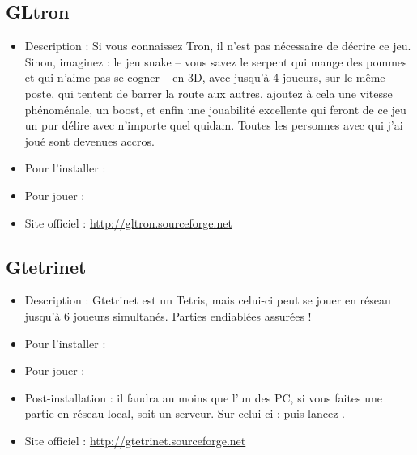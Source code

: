 \subsection{GLtron}
\begin{itemize}
\begingroup
{}
\item Description : Si vous connaissez Tron, il n'est pas nécessaire de décrire ce jeu. Sinon, imaginez : le jeu snake -- vous savez le serpent qui mange des pommes et qui n'aime pas se cogner -- en 3D, avec jusqu'à 4 joueurs, sur le même poste, qui tentent de barrer la route aux autres, ajoutez à cela une vitesse phénoménale, un boost, et enfin une jouabilité excellente qui feront de ce jeu un pur délire avec n'importe quel quidam. Toutes les personnes avec qui j'ai joué sont devenues accros.{\par}
\item Pour l'installer : 
\item Pour jouer : 
\item Site officiel : \url{http://gltron.sourceforge.net}{\par}
\endgroup
\end{itemize}
\subsection{Gtetrinet}
\begin{itemize}
\begingroup
{}
\item Description : Gtetrinet est un Tetris, mais celui-ci peut se jouer en réseau jusqu'à 6 joueurs simultanés. Parties endiablées assurées !{\par}
\endgroup
\item Pour l'installer : 
\item Pour jouer : 
\item Post-installation : il faudra au moins que l'un des PC, si vous faites une partie en réseau local, soit un serveur. Sur celui-ci :  puis lancez .{\par}
\item Site officiel : \url{http://gtetrinet.sourceforge.net}{\par}
\end{itemize}
